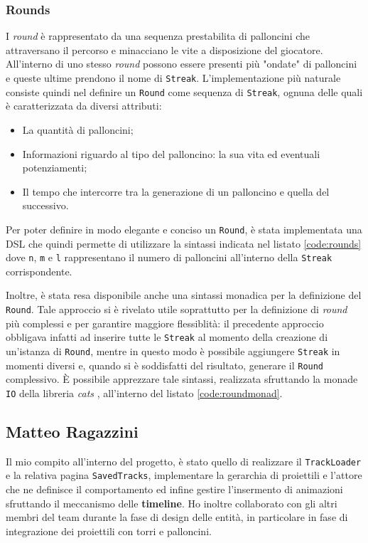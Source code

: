 \subsubsection{Rounds}
I \textit{round} è rappresentato da una sequenza prestabilita di palloncini che attraversano il percorso e minacciano le
vite a disposizione del giocatore. All'interno di uno stesso \textit{round} possono essere presenti più "ondate" di
palloncini e queste ultime prendono il nome di \texttt{Streak}. L'implementazione più naturale consiste quindi nel
definire un \texttt{Round} come sequenza di \texttt{Streak}, ognuna delle quali è caratterizzata da diversi attributi:
\begin{itemize}
    \item La quantità di palloncini;
    \item Informazioni riguardo al tipo del palloncino: la sua vita ed eventuali potenziamenti;
    \item Il tempo che intercorre tra la generazione di un palloncino e quella del successivo.
\end{itemize}

Per poter definire in modo elegante e conciso un \texttt{Round}, è stata implementata una DSL che quindi permette di
utilizzare la sintassi indicata nel listato \ref{code:rounds} dove \texttt{n}, \texttt{m} e \texttt{l} rappresentano il
numero di palloncini all'interno della \texttt{Streak} corrispondente.


Inoltre, è stata resa disponibile anche una sintassi monadica per la definizione del \texttt{Round}. Tale approccio si è
rivelato utile soprattutto per la definizione di \textit{round} più complessi e per garantire maggiore flessiblità: il
precedente approccio obbligava infatti ad inserire tutte le \texttt{Streak} al momento della creazione di un'istanza di
\texttt{Round}, mentre in questo modo è possibile aggiungere \texttt{Streak} in momenti diversi e, quando si è
soddisfatti del risultato, generare il \texttt{Round} complessivo. È possibile apprezzare tale sintassi, realizzata
sfruttando la monade \texttt{IO} della libreria \textit{cats} \cite{cats-effects}, all'interno del listato
\ref{code:roundmonad}.


\subsection{Matteo Ragazzini}\label{subsec:matteo-ragazzini}
Il mio compito all'interno del progetto, è stato quello di realizzare il \texttt{TrackLoader} e la relativa pagina
\texttt{SavedTracks}, implementare la gerarchia di proiettili e l'attore che ne definisce il comportamento ed infine
gestire l'insermento di animazioni sfruttando il meccanismo delle \textbf{timeline}.
Ho inoltre collaborato con gli altri membri del team durante la fase di design delle entità, in particolare
in fase di integrazione dei proiettili con torri e palloncini.


